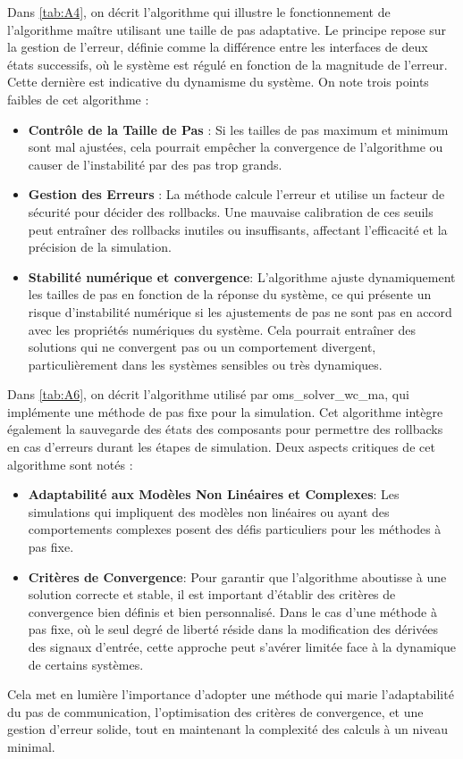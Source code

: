 Dans \ref{tab:A4}, on décrit l'algorithme qui illustre le fonctionnement de l'algorithme maître utilisant une taille de pas adaptative. Le principe repose sur la gestion de l'erreur, définie comme la différence entre les interfaces de deux états successifs, où le système est régulé en fonction de la magnitude de l'erreur. Cette dernière est indicative du dynamisme du système. On note trois points faibles de cet algorithme : 
\begin{itemize}
    \item \textbf{Contrôle de la Taille de Pas} : Si les tailles de pas maximum et minimum sont mal ajustées, cela pourrait empêcher la convergence de l'algorithme ou causer de l'instabilité par des pas trop grands.
    \item \textbf{Gestion des Erreurs} : La méthode calcule l'erreur et utilise un facteur de sécurité pour décider des rollbacks. Une mauvaise calibration de ces seuils peut entraîner des rollbacks inutiles ou insuffisants, affectant l'efficacité et la précision de la simulation.
    \item \textbf{Stabilité numérique et convergence}: L'algorithme ajuste dynamiquement les tailles de pas en fonction de la réponse du système, ce qui présente un risque d'instabilité numérique si les ajustements de pas ne sont pas en accord avec les propriétés numériques du système. Cela pourrait entraîner des solutions qui ne convergent pas ou un comportement divergent, particulièrement dans les systèmes sensibles ou très dynamiques.
\end{itemize}

Dans \ref{tab:A6}, on décrit l'algorithme utilisé par oms\_solver\_wc\_ma, qui implémente une méthode de pas fixe pour la simulation. Cet algorithme intègre également la sauvegarde des états des composants pour permettre des rollbacks en cas d'erreurs durant les étapes de simulation. Deux aspects critiques de cet algorithme sont notés :
\begin{itemize}
    \item \textbf{Adaptabilité aux Modèles Non Linéaires et Complexes}: Les simulations qui impliquent des modèles non linéaires ou ayant des comportements complexes posent des défis particuliers pour les méthodes à pas fixe. 
    \item \textbf{Critères de Convergence}: Pour garantir que l'algorithme aboutisse à une solution correcte et stable, il est important d'établir des critères de convergence bien définis et bien personnalisé. Dans le cas d'une méthode à pas fixe, où le seul degré de liberté réside dans la modification des dérivées des signaux d'entrée, cette approche peut s'avérer limitée face à la dynamique de certains systèmes.
\end{itemize}
Cela met en lumière l'importance d'adopter une méthode qui marie l'adaptabilité du pas de communication, l'optimisation des critères de convergence, et une gestion d'erreur solide, tout en maintenant la complexité des calculs à un niveau minimal.

